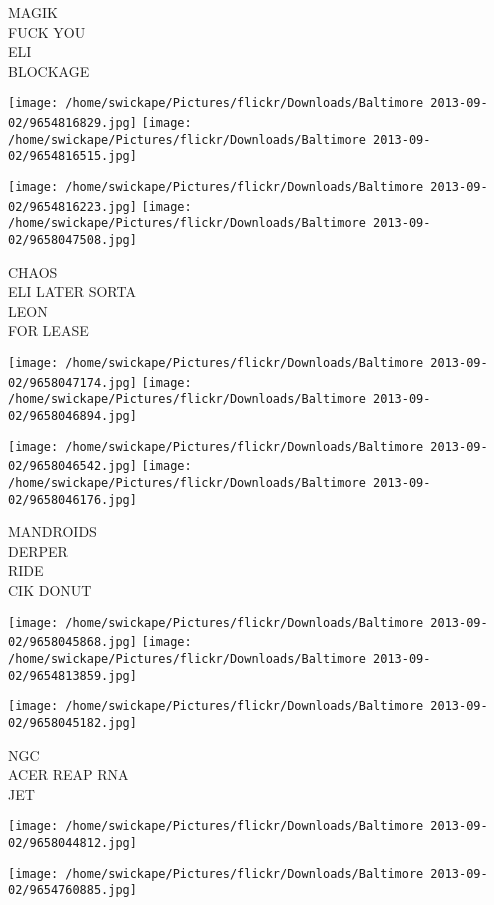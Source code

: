 \documentclass[10pt,letterpaper]{article}
\begin{document}
MAGIK\\
FUCK YOU\\
ELI\\
BLOCKAGE\\
\pagebreak

\texttt{[image: /home/swickape/Pictures/flickr/Downloads/Baltimore 2013-09-02/9654816829.jpg]}
\texttt{[image: /home/swickape/Pictures/flickr/Downloads/Baltimore 2013-09-02/9654816515.jpg]}

\texttt{[image: /home/swickape/Pictures/flickr/Downloads/Baltimore 2013-09-02/9654816223.jpg]}
\texttt{[image: /home/swickape/Pictures/flickr/Downloads/Baltimore 2013-09-02/9658047508.jpg]}

CHAOS\\
ELI LATER SORTA\\
LEON\\
FOR LEASE\\
\pagebreak

\texttt{[image: /home/swickape/Pictures/flickr/Downloads/Baltimore 2013-09-02/9658047174.jpg]}
\texttt{[image: /home/swickape/Pictures/flickr/Downloads/Baltimore 2013-09-02/9658046894.jpg]}

\texttt{[image: /home/swickape/Pictures/flickr/Downloads/Baltimore 2013-09-02/9658046542.jpg]}
\texttt{[image: /home/swickape/Pictures/flickr/Downloads/Baltimore 2013-09-02/9658046176.jpg]}

MANDROIDS\\
DERPER\\
RIDE\\
CIK DONUT\\
\pagebreak

\texttt{[image: /home/swickape/Pictures/flickr/Downloads/Baltimore 2013-09-02/9658045868.jpg]}
\texttt{[image: /home/swickape/Pictures/flickr/Downloads/Baltimore 2013-09-02/9654813859.jpg]}

\texttt{[image: /home/swickape/Pictures/flickr/Downloads/Baltimore 2013-09-02/9658045182.jpg]}

NGC\\
ACER REAP RNA\\
JET\\
\pagebreak

\texttt{[image: /home/swickape/Pictures/flickr/Downloads/Baltimore 2013-09-02/9658044812.jpg]}

\vspace{0.25in}
\texttt{[image: /home/swickape/Pictures/flickr/Downloads/Baltimore 2013-09-02/9654760885.jpg]}
\end{document}
